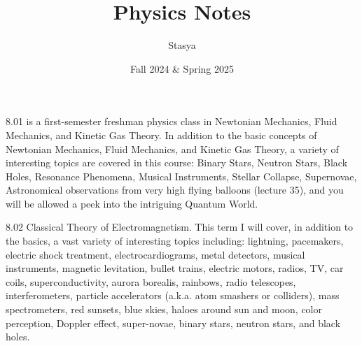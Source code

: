 \documentclass[10pt,a4paper,oneside]{book}
\title{Physics Notes}
\author{Stasya}
\date{Fall 2024 \& Spring 2025}
\begin{document}
\maketitle
\bigbreak
\begin{center}
    8.01 is a first-semester freshman physics class in Newtonian Mechanics, Fluid Mechanics, and Kinetic Gas Theory. In addition 
    to the basic concepts of Newtonian Mechanics, Fluid Mechanics, and Kinetic Gas Theory, a variety of interesting topics are 
    covered in this course: Binary Stars, Neutron Stars, Black Holes, Resonance Phenomena, Musical Instruments, Stellar Collapse, 
    Supernovae, Astronomical observations from very high flying balloons (lecture 35), and you will be allowed a peek into the 
    intriguing Quantum World.

    8.02 Classical Theory of Electromagnetism. This term I will cover, in addition to the basics, a vast variety of interesting 
    topics including: lightning, pacemakers, electric shock treatment, electrocardiograms, metal detectors, musical instruments, 
    magnetic levitation, bullet trains, electric motors, radios, TV, car coils, superconductivity, aurora borealis, rainbows, 
    radio telescopes, interferometers, particle accelerators (a.k.a. atom smashers or colliders), mass spectrometers, red sunsets, 
    blue skies, haloes around sun and moon, color perception, Doppler effect, super-novae, binary stars, neutron stars, and 
    black holes.
\end{center}
\smallbreak
\tableofcontents








\end{document}
